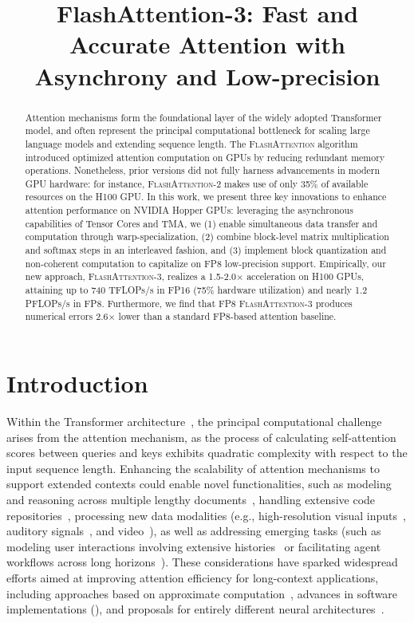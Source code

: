 \title{FlashAttention-3: Fast and Accurate Attention with Asynchrony and Low-precision}

\begin{abstract}
Attention mechanisms form the foundational layer of the widely adopted Transformer model, and often represent the principal computational bottleneck for scaling large language models and extending sequence length. The \textsc{FlashAttention} algorithm introduced optimized attention computation on GPUs by reducing redundant memory operations. Nonetheless, prior versions did not fully harness advancements in modern GPU hardware: for instance, \textsc{FlashAttention-2} makes use of only 35\% of available resources on the H100 GPU. In this work, we present three key innovations to enhance attention performance on NVIDIA Hopper GPUs: leveraging the asynchronous capabilities of Tensor Cores and TMA, we (1) enable simultaneous data transfer and computation through warp-specialization, (2) combine block-level matrix multiplication and softmax steps in an interleaved fashion, and (3) implement block quantization and non-coherent computation to capitalize on FP8 low-precision support. Empirically, our new approach, \textsc{FlashAttention-3}, realizes a 1.5-2.0$\times$ acceleration on H100 GPUs, attaining up to 740 TFLOPs/s in FP16 (75\% hardware utilization) and nearly 1.2 PFLOPs/s in FP8. Furthermore, we find that FP8 \textsc{FlashAttention-3} produces numerical errors 2.6$\times$ lower than a standard FP8-based attention baseline.
\end{abstract}

\section{Introduction}
\label{sec:intro}

Within the Transformer architecture~\citep{vaswani2017attention}, the principal computational challenge arises from the attention mechanism, as the process of calculating self-attention scores between queries and keys exhibits quadratic complexity with respect to the input sequence length. Enhancing the scalability of attention mechanisms to support extended contexts could enable novel functionalities, such as modeling and reasoning across multiple lengthy documents~\citep{guo2021longt5,shaham2022scrolls,peng2023yarn}, handling extensive code repositories~\citep{roziere2023code, li2023starcoder}, processing new data modalities (e.g., high-resolution visual inputs~\citep{chen2022scaling}, auditory signals~\citep{gulati2020conformer}, and video~\citep{ho2022video}), as well as addressing emerging tasks (such as modeling user interactions involving extensive histories~\citep{sun2019bert4rec} or facilitating agent workflows across long horizons~\citep{yao2022react}). These considerations have sparked widespread efforts aimed at improving attention efficiency for long-context applications, including approaches based on approximate computation~\citep{katharopoulos2020transformers,choromanski2020rethinking,
tay2020efficient}, advances in software implementations (\citep{rabe2021self,dao2022flashattention,kwon2023efficient}), and proposals for entirely different neural architectures~\citep{peng2023rwkv,sun2023retentive,gu2023mamba}.

